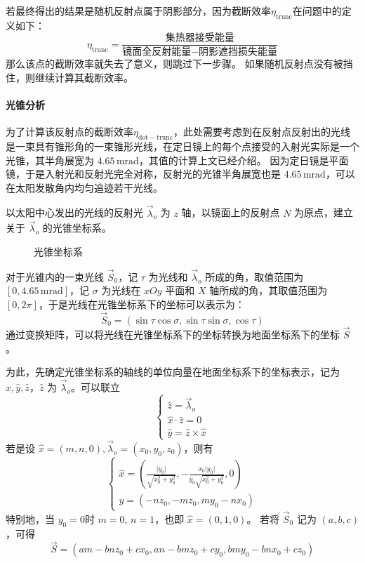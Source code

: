 \documentclass[../main.tex]{subfiles}
\begin{document}
若最终得出的结果是随机反射点属于阴影部分，因为截断效率\(\eta _{\mathrm{trunc}}\)在问题中的定义如下：
\begin{equation}
\eta _{\mathrm{trunc}} = \frac{\text{集热器接受能量}}{\text{镜面全反射能量} - \text{阴影遮挡损失能量}}
\end{equation}
那么该点的截断效率就失去了意义，则跳过下一步骤。
如果随机反射点没有被挡住，则继续计算其截断效率。

\paragraph{光锥分析}
为了计算该反射点的截断效率\(\eta _{\mathrm{dot}{-}\mathrm{trunc}}\)，此处需要考虑到在反射点反射出的光线是一束具有锥形角的一束锥形光线，在定日镜上的每个点接受的入射光实际是一个光锥，其半角展宽为 \(4.65 \, \mathrm{m}\mathrm{rad}\)，其值的计算上文已经介绍。
因为定日镜是平面镜，于是入射光和反射光完全对称，反射光的光锥半角展宽也是 \(4.65\, \mathrm{mrad}\)，可以在太阳发散角内均匀追迹若干光线。

以太阳中心发出的光线的反射光 \(\vec\lambda _{o} \) 为 \(z\) 轴，以镜面上的反射点 \(N\) 为原点，建立关于 \(\vec \lambda _{o}\) 的光锥坐标系。
%
\begin{figure}[H]
\centering

\caption{\kaishu 光锥坐标系}
\end{figure}
%

对于光锥内的一束光线 \(\vec S _{0}\)，记 \(\tau\) 为光线和 \(\vec\lambda _{o}\) 所成的角，取值范围为 \([0, 4.65\, \mathrm{m}\mathrm{rad}]\)，记 \(\sigma\) 为光线在 \(xOy\) 平面和 \(X\) 轴所成的角，其取值范围为 \([0 , 2\pi]\)，于是光线在光锥坐标系下的坐标可以表示为：
\[
\vec S _{0} = ( \sin \tau \cos \sigma, \sin \tau \sin \sigma, \cos \tau)
\]
通过变换矩阵，可以将光线在光锥坐标系下的坐标转换为地面坐标系下的坐标 \(\vec S\)。

为此，先确定光锥坐标系的轴线的单位向量在地面坐标系下的坐标表示，记为 \(\hat x, \hat y, \hat z\)，\(\hat z\) 为 \(\vec \lambda _{o}\)。可以联立
\[
\begin{cases}
\hat z = \vec \lambda _{o}\\
\hat x \cdot \hat z = 0\\
\hat y = \hat z \times \hat x
\end{cases}
\]
若是设 \(\hat x = (m , n , 0), \vec \lambda _{o} = (x_0, y_0,z_0)\)，则有
\[
\begin{cases}
\displaystyle\hat x = \left(\frac{\vert y_{0} \vert}{\sqrt{x_{0}^{2}+ y _{0} ^{2}}}, {-}\frac{x_{0}\vert y_{0} \vert}{y_{0}\sqrt{x_{0}^{2}+y_{0}^{2}}}, 0\right)\\
\displaystyle \hat y = ({-} n z_{0}, - m z_{0} , my_{0} - n x_{0})
\end{cases}
\]
特别地，当 \(y_{0} = 0\)时 \(m = 0 \), \(n=1\)，也即 \(\hat x  = (0,1,0)\)。
若将 \(\vec S_{0}\) 记为 \((a,b ,c)\)，可得
\begin{equation}
\vec S = (am - b nz _{0}+ c x_{0}, an - bmz_{0} + cy_{0}, bmy_{0} - bnx _{0} + cz_{0})
\end{equation}
\end{document}

